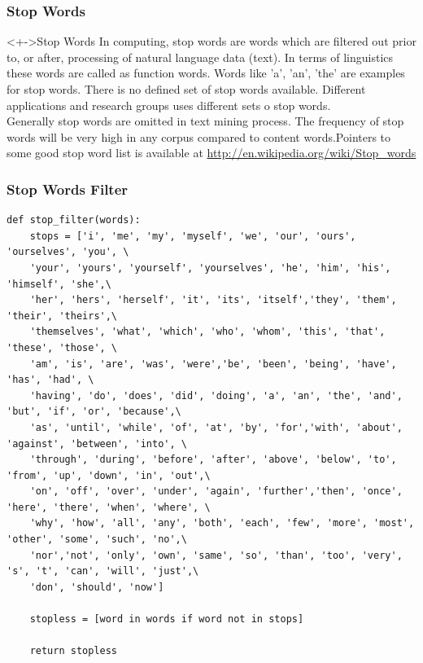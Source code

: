 \documentclass[serif,11pt,aspectratio=1610,table]{beamer}
\begin{document}
\begin{frame}[fragile]
 \frametitle{Stop Words}
\begin{block}<+->{Stop Words}
 In computing, stop words are words which are filtered out prior to, or after, processing of natural language data (text).
 In terms of linguistics these words are called as function words. Words like 'a', 'an', 'the' are examples for stop words. There is no defined set of stop words available. Different applications and research groups uses different sets o stop words. \\
 Generally stop words are omitted in text mining process. The frequency of stop words will be very high in any corpus compared to content words.Pointers to some good stop word list is available at \url{http://en.wikipedia.org/wiki/Stop_words}
\end{block}

\end{frame}


\begin{frame}[fragile]
 \frametitle{Stop Words Filter}
\tiny
\begin{verbatim}
def stop_filter(words):
    stops = ['i', 'me', 'my', 'myself', 'we', 'our', 'ours', 'ourselves', 'you', \
    'your', 'yours', 'yourself', 'yourselves', 'he', 'him', 'his', 'himself', 'she',\
    'her', 'hers', 'herself', 'it', 'its', 'itself','they', 'them', 'their', 'theirs',\
    'themselves', 'what', 'which', 'who', 'whom', 'this', 'that', 'these', 'those', \
    'am', 'is', 'are', 'was', 'were','be', 'been', 'being', 'have', 'has', 'had', \
    'having', 'do', 'does', 'did', 'doing', 'a', 'an', 'the', 'and', 'but', 'if', 'or', 'because',\
    'as', 'until', 'while', 'of', 'at', 'by', 'for','with', 'about', 'against', 'between', 'into', \
    'through', 'during', 'before', 'after', 'above', 'below', 'to', 'from', 'up', 'down', 'in', 'out',\
    'on', 'off', 'over', 'under', 'again', 'further','then', 'once', 'here', 'there', 'when', 'where', \
    'why', 'how', 'all', 'any', 'both', 'each', 'few', 'more', 'most', 'other', 'some', 'such', 'no',\
    'nor','not', 'only', 'own', 'same', 'so', 'than', 'too', 'very', 's', 't', 'can', 'will', 'just',\
    'don', 'should', 'now']

    stopless = [word in words if word not in stops]
    
    return stopless
\end{verbatim}

\end{frame}
\end{document}
